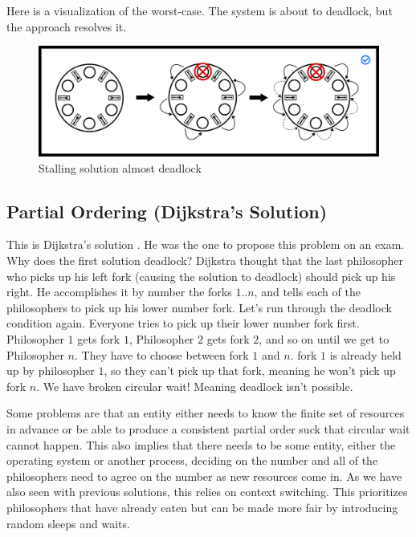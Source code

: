 Here is a visualization of the worst-case.
The system is about to deadlock, but the approach resolves it.

\begin{figure}[H]
\centering
\includegraphics[width=.9\textwidth]{deadlock/drawings/dining_stalling.eps}
\caption{Stalling solution almost deadlock}
\end{figure}


\subsection{Partial Ordering (Dijkstra's Solution)}

This is Dijkstra's solution \cite[P. 20]{EWD:EWD310}. He was the one to propose this problem on an exam.
Why does the first solution deadlock? Dijkstra thought that the last philosopher who picks up his left fork (causing the solution to deadlock) should pick up his right.
He accomplishes it by number the forks $1..n$, and tells each of the philosophers to pick up his lower number fork.
Let's run through the deadlock condition again.
Everyone tries to pick up their lower number fork first.
Philosopher $1$ gets fork $1$, Philosopher $2$ gets fork $2$, and so on until we get to Philosopher $n$.
They have to choose between fork $1$ and $n$.
fork $1$ is already held up by philosopher $1$, so they can't pick up that fork, meaning he won't pick up fork $n$.
We have broken circular wait! Meaning deadlock isn't possible.

Some problems are that an entity either needs to know the finite set of resources in advance or be able to produce a consistent partial order suck that circular wait cannot happen.
This also implies that there needs to be some entity, either the operating system or another process, deciding on the number and all of the philosophers need to agree on the number as new resources come in.
As we have also seen with previous solutions, this relies on context switching.
This prioritizes philosophers that have already eaten but can be made more fair by introducing random sleeps and waits.

